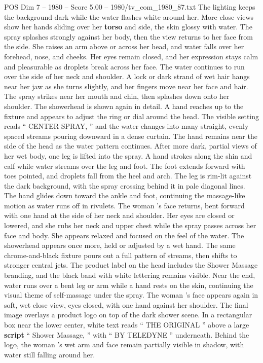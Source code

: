 \begin{textsample}{POS Dim 7 – 1980 – Score 5.00 – 1980/tv\_com\_1980\_87.txt}
The lighting keeps the background dark while the water flashes white around her.
More close views show her hands sliding over her \textbf{torso} and side, the skin glossy with water.
The spray splashes strongly against her body, then the view returns to her face from the side.
She raises an arm above or across her head, and water falls over her forehead, nose, and cheeks.
Her eyes remain closed, and her expression stays calm and pleasurable as droplets break across her face.
The water continues to run over the side of her neck and shoulder.
A lock or dark strand of wet hair hangs near her jaw as she turns slightly, and her fingers move near her face and hair.
The spray strikes near her mouth and chin, then splashes down onto her shoulder.
The showerhead is shown again in detail.
A hand reaches up to the fixture and appears to adjust the ring or dial around the head.
The visible setting reads “ CENTER SPRAY, ” and the water changes into many straight, evenly spaced streams pouring downward in a dense curtain.
The hand remains near the side of the head as the water pattern continues.
After more dark, partial views of her wet body, one leg is lifted into the spray.
A hand strokes along the shin and calf while water streams over the leg and foot.
The foot extends forward with toes pointed, and droplets fall from the heel and arch.
The leg is rim-lit against the dark background, with the spray crossing behind it in pale diagonal lines.
The hand glides down toward the ankle and foot, continuing the massage-like motion as water runs off in rivulets.
The woman ’s face returns, bent forward with one hand at the side of her neck and shoulder.
Her eyes are closed or lowered, and she rubs her neck and upper chest while the spray passes across her face and body.
She appears relaxed and focused on the feel of the water.
The showerhead appears once more, held or adjusted by a wet hand.
The same chrome-and-black fixture pours out a full pattern of streams, then shifts to stronger central jets.
The product label on the head includes the Shower Massage branding, and the black band with white lettering remains visible.
Near the end, water runs over a bent leg or arm while a hand rests on the skin, continuing the visual theme of self-massage under the spray.
The woman ’s face appears again in soft, wet close view, eyes closed, with one hand against her shoulder.
The final image overlays a product logo on top of the dark shower scene.
In a rectangular box near the lower center, white text reads “ THE ORIGINAL ” above a large \textbf{script} “ Shower Massage, ” with “ BY TELEDYNE ” underneath.
Behind the logo, the woman ’s wet arm and face remain partially visible in shadow, with water still falling around her.

\end{textsample}
